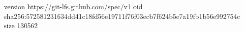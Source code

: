 version https://git-lfs.github.com/spec/v1
oid sha256:572581231634dd41c18fd56e19711f76f03ecb7f624b5e7a19fb1b56e992754c
size 130562

